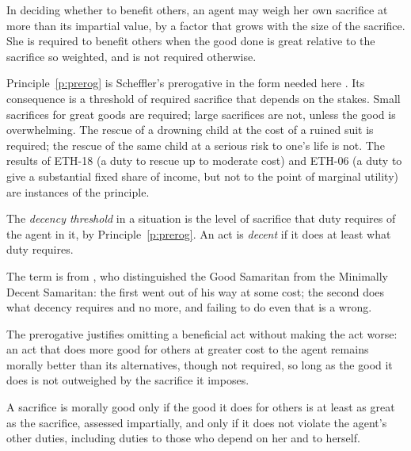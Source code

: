 \documentclass{situationist-preprint}
\begin{document}
\begin{principle}[Prerogative]\label{p:prerog}
In deciding whether to benefit others, an agent may weigh her own sacrifice at more than its impartial value, by a factor that grows with the size of the sacrifice. She is required to benefit others when the good done is great relative to the sacrifice so weighted, and is not required otherwise.
\end{principle}

Principle~\ref{p:prerog} is Scheffler's prerogative in the form needed here \citep{Scheffler1982}. Its consequence is a threshold of required sacrifice that depends on the stakes. Small sacrifices for great goods are required; large sacrifices are not, unless the good is overwhelming. The rescue of a drowning child at the cost of a ruined suit is required; the rescue of the same child at a serious risk to one's life is not. The results of ETH-18 (a duty to rescue up to moderate cost) and ETH-06 (a duty to give a substantial fixed share of income, but not to the point of marginal utility) are instances of the principle.

\begin{definition}[Decency]\label{d:decency}
The \emph{decency threshold} in a situation is the level of sacrifice that duty requires of the agent in it, by Principle~\ref{p:prerog}. An act is \emph{decent} if it does at least what duty requires.
\end{definition}

The term is from \citet{Thomson1971}, who distinguished the Good Samaritan from the Minimally Decent Samaritan: the first went out of his way at some cost; the second does what decency requires and no more, and failing to do even that is a wrong.

\begin{principle}\label{p:justify}
The prerogative justifies omitting a beneficial act without making the act worse: an act that does more good for others at greater cost to the agent remains morally better than its alternatives, though not required, so long as the good it does is not outweighed by the sacrifice it imposes.
\end{principle}

\begin{principle}[Proportion]\label{p:prop}
A sacrifice is morally good only if the good it does for others is at least as great as the sacrifice, assessed impartially, and only if it does not violate the agent's other duties, including duties to those who depend on her and to herself.
\end{principle}
\end{document}
